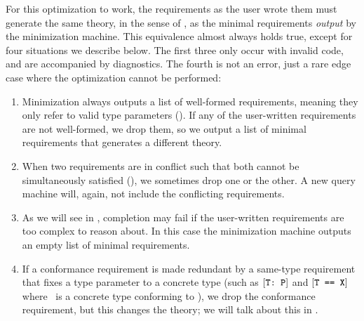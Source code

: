 \documentclass[../generics]{subfiles}
\begin{document}
\begin{center}
\end{center}

For this optimization to work, the requirements as the user wrote them must generate the same theory, in the sense of , as the minimal requirements \emph{output} by the minimization machine. This equivalence almost always holds true, except for four situations we describe below. The first three only occur with invalid code, and are accompanied by diagnostics. The fourth is not an error, just a rare edge case where the optimization cannot be performed:
\begin{enumerate}
\item Minimization always outputs a list of well-formed requirements, meaning they only refer to valid type parameters (). If any of the user-written requirements are not well-formed, we drop them, so we output a list of minimal requirements that generates a different theory.

\item When two requirements are in conflict such that both cannot be simultaneously satisfied (), we sometimes drop one or the other. A new query machine will, again, not include the conflicting requirements.

\item As we will see in , completion may fail if the user-written requirements are too complex to reason about. In this case the minimization machine outputs an empty list of minimal requirements.

\item If a conformance requirement is made redundant by a same-type requirement that fixes a type parameter to a concrete type (such as $[\texttt{T:~P}]$ and $[\texttt{T == X}]$ where \tX\ is a concrete type conforming to \tP), we drop the conformance requirement, but this changes the theory; we will talk about this in .
\end{enumerate}
\end{document}
